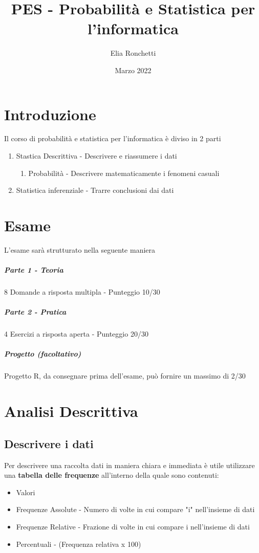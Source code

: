 \documentclass[12pt, a4paper, openany]{book}
\begin{document}
\title{PES - Probabilità e Statistica per l'informatica}
\author{Elia Ronchetti}
\date{Marzo 2022}

\maketitle
\tableofcontents
\chapter{Introduzione}
Il corso di probabilità e statistica per l'informatica è diviso in 2 parti
\begin{enumerate}
    \item Stastica Descrittiva - Descrivere e riassumere i dati
    \begin{enumerate}
        \item Probabilità - Descrivere matematicamente i fenomeni casuali
    \end{enumerate}
    \item Statistica inferenziale - Trarre conclusioni dai dati
\end{enumerate}

\chapter{Esame}
L'esame sarà strutturato nella seguente maniera
\paragraph{Parte 1 - Teoria}
8 Domande a risposta multipla - Punteggio 10/30
\paragraph{Parte 2 - Pratica}
4 Esercizi a risposta aperta - Punteggio 20/30
\paragraph{Progetto (facoltativo)}
Progetto R, da consegnare prima dell'esame, può fornire un massimo di 2/30

\chapter{Analisi Descrittiva}
\section{Descrivere i dati}
Per descrivere una raccolta dati in maniera chiara e immediata è utile utilizzare una \textbf{tabella delle frequenze}
all'interno della quale sono contenuti:
\begin{itemize}
    \item Valori
    \item Frequenze Assolute - Numero di volte in cui compare "i" nell'insieme di dati
    \item Frequenze Relative - Frazione di volte in cui compare i nell'insieme di dati
    \item Percentuali - (Frequenza relativa x 100)
\end{itemize}
\end{document}
